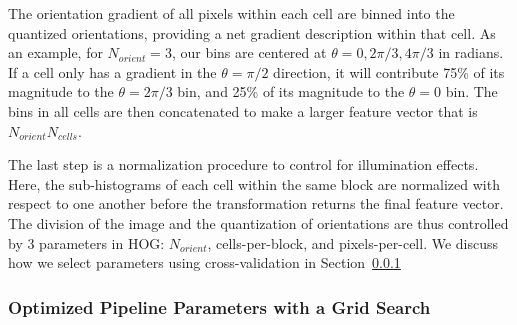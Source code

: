 \documentclass{emulateapj}
\begin{document}
The orientation gradient of all pixels within each cell are binned
into the quantized orientations, providing a net gradient description
within that cell.  As an example, for $N_{orient}=3$, our bins are
centered at $\theta=0, 2\pi/3, 4\pi/3$ in radians.  If a cell
only has a gradient in the
$\theta=\pi/2$ direction, it will contribute 75\% of its magnitude to the
$\theta=2\pi/3$ bin, and 25\% of its magnitude to the $\theta=0$ bin.
The bins in all cells are then concatenated to make a larger feature
vector that is $N_{orient}$\times$N_{cells}$.

The last step is a normalization procedure to control for illumination
effects.  Here, the sub-histograms of each cell within the same block
are normalized with respect to one another before the transformation
returns the final feature vector.  The division of the image and the
quantization of orientations are thus controlled by 3 parameters in HOG:
$N_{orient}$, cells-per-block, and pixels-per-cell.  We discuss how we
select parameters using cross-validation in
Section~\ref{sec:gridsearch}

\subsubsection{Optimized Pipeline Parameters with a Grid Search}\label{sec:gridsearch}
\end{document}
